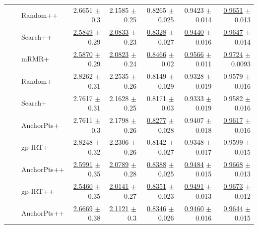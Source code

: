 \begin{longtable}{llp{}rrrrr}
 &  & Random++ & 2.6651 {\scriptsize $\pm$ 0.3} & 2.1585 {\scriptsize $\pm$ 0.25} & 0.8265 {\scriptsize $\pm$ 0.025} & 0.9423 {\scriptsize $\pm$ 0.014} & \underline{0.9651} {\scriptsize $\pm$ 0.013} \\
 &  & Search++ & \underline{2.5849} {\scriptsize $\pm$ 0.29} & \underline{2.0833} {\scriptsize $\pm$ 0.23} & \underline{0.8328} {\scriptsize $\pm$ 0.027} & \underline{0.9440} {\scriptsize $\pm$ 0.016} & \underline{0.9647} {\scriptsize $\pm$ 0.014} \\
 &  & mRMR+ & \underline{2.5870} {\scriptsize $\pm$ 0.29} & \underline{2.0823} {\scriptsize $\pm$ 0.24} & \underline{0.8466} {\scriptsize $\pm$ 0.02} & \underline{0.9566} {\scriptsize $\pm$ 0.011} & \underline{0.9724} {\scriptsize $\pm$ 0.0093} \\
 &  & Random+ & 2.8262 {\scriptsize $\pm$ 0.31} & 2.2535 {\scriptsize $\pm$ 0.26} & 0.8149 {\scriptsize $\pm$ 0.029} & 0.9328 {\scriptsize $\pm$ 0.019} & 0.9579 {\scriptsize $\pm$ 0.016} \\
 &  & Search+ & 2.7617 {\scriptsize $\pm$ 0.31} & 2.1628 {\scriptsize $\pm$ 0.25} & 0.8171 {\scriptsize $\pm$ 0.03} & 0.9333 {\scriptsize $\pm$ 0.019} & 0.9582 {\scriptsize $\pm$ 0.016} \\
 &  & AnchorPts+ & 2.7611 {\scriptsize $\pm$ 0.3} & 2.1798 {\scriptsize $\pm$ 0.26} & \underline{0.8277} {\scriptsize $\pm$ 0.028} & 0.9407 {\scriptsize $\pm$ 0.018} & \underline{0.9617} {\scriptsize $\pm$ 0.016} \\
 &  & gp-IRT+ & 2.8248 {\scriptsize $\pm$ 0.32} & 2.2306 {\scriptsize $\pm$ 0.26} & 0.8142 {\scriptsize $\pm$ 0.027} & 0.9348 {\scriptsize $\pm$ 0.017} & 0.9599 {\scriptsize $\pm$ 0.015} \\
 &  & AnchorPts++ & \underline{2.5991} {\scriptsize $\pm$ 0.35} & \underline{2.0789} {\scriptsize $\pm$ 0.28} & \underline{0.8388} {\scriptsize $\pm$ 0.025} & \underline{0.9484} {\scriptsize $\pm$ 0.015} & \underline{0.9668} {\scriptsize $\pm$ 0.013} \\
 &  & gp-IRT++ & \underline{2.5460} {\scriptsize $\pm$ 0.35} & \underline{2.0141} {\scriptsize $\pm$ 0.27} & \underline{0.8351} {\scriptsize $\pm$ 0.023} & \underline{0.9491} {\scriptsize $\pm$ 0.013} & \underline{0.9673} {\scriptsize $\pm$ 0.012} \\
 &  & AnchorPts++ & \underline{2.6669} {\scriptsize $\pm$ 0.38} & \underline{2.1121} {\scriptsize $\pm$ 0.3} & \underline{0.8346} {\scriptsize $\pm$ 0.026} & \underline{0.9460} {\scriptsize $\pm$ 0.016} & \underline{0.9644} {\scriptsize $\pm$ 0.015} \\

\end{longtable}
